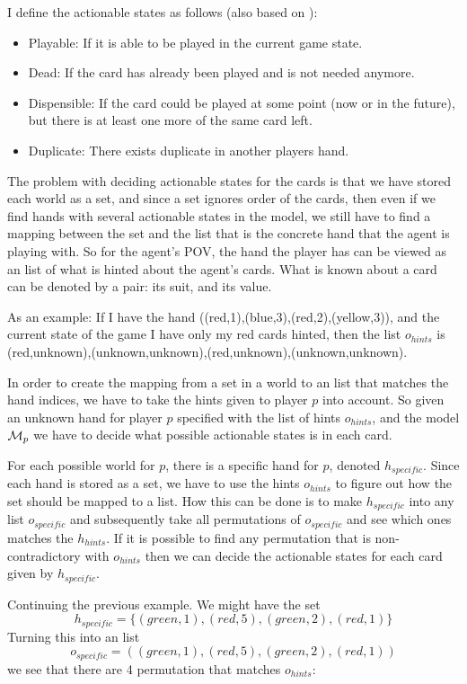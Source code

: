 I define the actionable states as follows (also based on \cite{CoxEtAl2015}):
\begin{itemize}
	\item Playable: If it is able to be played in the current game state.
	\item Dead: If the card has already been played and is not needed anymore.
	\item Dispensible: If the card could be played at some point (now or in the future), but there is at least one more of the same card left.
	\item Duplicate: There exists duplicate in another players hand.
\end{itemize}

The problem with deciding actionable states for the cards is that we have stored each world as a set, and since a set ignores order of the cards, then even if we find hands with several actionable states in the model, we still have to find a mapping between the set and the list that is the concrete hand that the agent is playing with.
So for the agent's POV, the hand the player has can be viewed as an list of what is hinted about the agent's cards. What is known about a card can be denoted by a pair: its suit, and its value. 

As an example: If I have the hand ((red,1),(blue,3),(red,2),(yellow,3)), and the current state of the game I have only my red cards hinted, then the list $o_{hints}$ is (red,unknown),(unknown,unknown),(red,unknown),(unknown,unknown).

In order to create the mapping from a set in a world to an list that matches the hand indices, we have to take the hints given to player $p$ into account.
So given an unknown hand for player $p$ specified with the list of hints $o_{hints}$, and the model $\mathcal{M}_p$ we have to decide what possible actionable states is in each card. 

For each possible world for $p$, there is a specific hand for $p$, denoted $h_{specific}$. Since each hand is stored as a set, we have to use the hints $o_{hints}$ to figure out how the set should be mapped to a list. How this can be done is to make $h_{specific}$ into any list $o_{specific}$ and subsequently take all permutations of $o_{specific}$ and see which ones matches the $h_{hints}$. If it is possible to find any permutation that is non-contradictory with $o_{hints}$ then we can decide the actionable states for each card given by $h_{specific}$.

Continuing the previous example. We might have the set \[h_{specific} = \{(green,1),(red,5),(green,2),(red,1)\}\]
Turning this into an list 
\[o_{specific} = ((green,1),(red,5),(green,2),(red,1))\]
we see that there are 4 permutation that matches $o_{hints}$:

